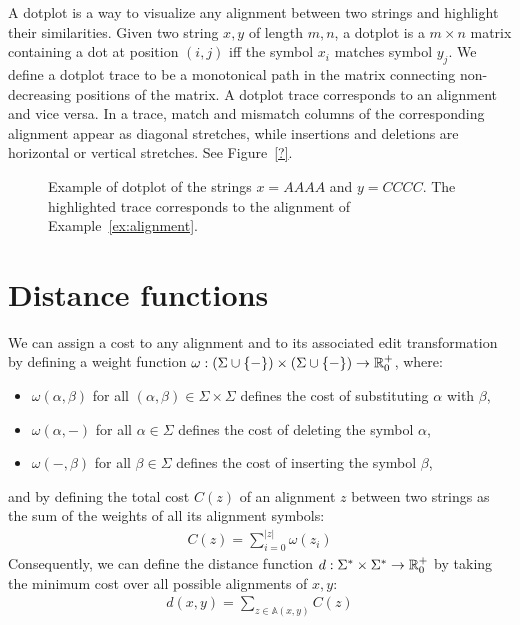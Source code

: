 A dotplot is a way to visualize any alignment between two strings and highlight their similarities.
Given two string $x,y$ of length $m,n$, a dotplot is a $m \times n$ matrix containing a dot at position $(i,j)$ iff the symbol $x_i$ matches symbol $y_j$.
We define a dotplot trace to be a monotonical path in the matrix connecting non-decreasing positions of the matrix.
A dotplot trace corresponds to an alignment and vice versa.
In a trace, match and mismatch columns of the corresponding alignment appear as diagonal stretches, while insertions and deletions are horizontal or vertical stretches.
See Figure~\ref{?}.

\begin{figure}[h]
\begin{center}
\caption[Example of dotplot.]{Example of dotplot of the strings $x=AAAA$ and $y=CCCC$. The highlighted trace corresponds to the alignment of Example~\ref{ex:alignment}.}
\label{fig:dotplot}

\end{center}
\end{figure}

\section{Distance functions}

We can assign a cost to any alignment and to its associated edit transformation by defining a weight function $\omega : (\Sigma \cup \{ - \}) \times (\Sigma \cup \{ - \}) \rightarrow \mathbb {R}_0^{+}$, where:
\begin{itemize}
\item $\omega(\alpha,\beta)$ for all $(\alpha,\beta) \in \Sigma \times \Sigma$ defines the cost of substituting $\alpha$ with $\beta$,
\item $\omega(\alpha,-)$ for all $\alpha \in \Sigma$ defines the cost of deleting the symbol $\alpha$,
\item $\omega(-,\beta)$ for all $\beta \in \Sigma$ defines the cost of inserting the symbol $\beta$,
\end{itemize}
and by defining the total cost $C(z)$ of an alignment $z$ between two strings as the sum of the weights of all its alignment symbols:
\begin{eqnarray}
C(z) = \sum_{i=0}^{|z|}{\omega(z_i)}
\end{eqnarray}
Consequently, we can define the distance function $d : \Sigma^{*} \times \Sigma^{*} \rightarrow \mathbb {R}_0^{+}$ by taking the minimum cost over all possible alignments of $x,y$:
\begin{eqnarray}
d(x,y) = \sum_{z \in \mathbb{A}(x,y)}{C(z)}
\end{eqnarray}

